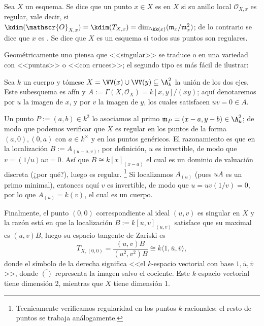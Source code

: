 \begin{mydef}
	Sea $X$ un esquema.
	Se dice que un punto $x\in X$ es  en $X$ si su anillo local $\mathscr{O}_{X, x}$ es regular,
	vale decir, si $\kdim(\mathscr{O}_{X, x}) = \kdim( T_{X, x} ) = \dim_{\kk(x)}( \mathfrak{m}_x / \mathfrak{m}_x^2 )$;
	de lo contrario se dice que $x$ es .
	Se dice que $X$ es un esquema  si todos sus puntos son regulares.
\end{mydef}
Geométricamente uno piensa que <<singular>> se traduce o en una variedad con <<puntas>> o <<con cruces>>;
el segundo tipo es más fácil de ilustrar:
\begin{ex}
	Sea $k$ un cuerpo y tómese $X = \VV(x) \cup \VV(y) \subseteq \A^2_k$ la unión de los dos ejes.
	Este subesquema es afín y $A := \Gamma(X, \mathscr{O}_X) = k[x, y]/(xy)$; aquí denotaremos por $u$ la imagen de $x$, y por $v$ la imagen de $y$,
	los cuales satisfacen $uv = 0 \in A$.

	Un punto $P := (a, b) \in k^2$ lo asociamos al primo $\mathfrak{m}_P = (x - a, y - b) \in \A^2_k$;
	de modo que podemos verificar que $X$ es regular en los puntos de la forma $(a, 0), (0, a)$ con $a \in k^\times$ y en los puntos genéricos.
	El razonamiento es que en la localización $B := A_{(u - a, v)}$, por definición, $u$ es invertible, de modo que $v = (1/u)uv = 0$.
	Así que $B \cong k[x]_{(x-a)}$ el cual es un dominio de valuación discreta (¿por qué?), luego es regular.%
	\footnote{Tecnicamente verificamos regularidad en los puntos $k$-racionales; el resto de puntos se trabaja análogamente.}
	Si localizamos $A_{(u)}$ (pues $uA$ es un primo minimal), entonces aquí $v$ es invertible, de modo que $u = uv(1/v) = 0$,
	por lo que $A_{(u)} = k(v)$, el cual es un cuerpo.

	Finalmente, el punto $(0, 0)$ correspondiente al ideal $(u, v)$ es singular en $X$ y la razón está en que la localización $B := k[u, v]_{(u, v)}$
	satisface que su maximal es $(u, v)B$, luego su espacio tangente de Zariski es
	$$ T_{X, (0,0)} = \frac{(u, v)B}{(u^2, v^2)B} \cong k\langle 1, \overline{u}, \overline{v} \rangle, $$
	donde el símbolo de la derecha significa <<el $k$-espacio vectorial con base $1, \overline{u}, \overline{v}$>>, donde $\overline{()}$ representa
	la imagen salvo el cociente.
	Este $k$-espacio vectorial tiene dimensión 2, mientras que $X$ tiene dimensión 1.
\end{ex}

